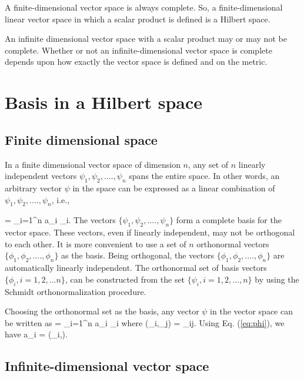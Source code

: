 A finite-dimensional vector space is always complete. So, a finite-dimensional linear vector space in which a scalar product is defined is a Hilbert space.

An infinite dimensional vector space with a scalar product may or may not be complete. Whether or not an infinite-dimensional vector space is complete depends upon how exactly the vector space is defined and on the metric.

\section{Basis in a Hilbert space}

\subsection{Finite dimensional space}

In a finite dimensional vector space of dimension $n$, any set of  $n$ linearly independent vectors $\psi_1, \psi_2, ...., \psi_n$ spans the entire space. In other words, an arbitrary vector $\psi$ in the space can be expressed as a linear combination of $\psi_1, \psi_2, ...., \psi_n$, i.e.,

\be
\psi = \sum_{i=1}^{n} a_i \psi_i.
\ee
The vectors $\{ \psi_1, \psi_2, ...., \psi_n\}$ form a complete basis for the vector space. These vectors, even if linearly independent, may not be orthogonal to each other. It is more convenient to use a set of $n$ orthonormal vectors $\{ \phi_1, \phi_2, ...., \phi_n\}$ as the basis. Being orthogonal, the vectors 
$\{ \phi_1, \phi_2, ...., \phi_n \}$ are automatically linearly independent. The orthonormal set of basis vectors 
$\{\phi_i, i=1,2,...n\}$, can be constructed from the set $\{\psi_i,i=1,2, ...,n\}$ by using the Schmidt orthonormalization procedure.

\vspace{3mm}
\hspace{5mm}Choosing the orthonormal set as the basis, any vector $\psi$ in the vector space can be written as
\be
\psi = \sum_{i=1}^{n} a_i \phi_i 
\ee
where
\be
(\phi_i,\phi_j) = \delta_{ij}.
\label{eq:phi}
\ee
Using Eq. (\ref{eq:phi}), we have 
\be
a_i = (\phi_i,\psi).
\ee


\subsection{Infinite-dimensional vector space}

